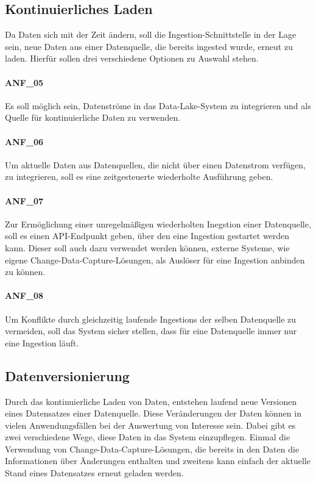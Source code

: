 \subsection{Kontinuierliches Laden}
Da Daten sich mit der Zeit ändern, soll die Ingestion-Schnittstelle in der Lage sein, neue Daten aus einer Datenquelle, die bereits ingested wurde, erneut zu laden.
Hierfür sollen drei verschiedene Optionen zu Auswahl stehen.

\paragraph{ANF\_05}
\label{ANF_05}
Es soll möglich sein, Datenströme in das Data-Lake-System zu integrieren und als Quelle für kontinuierliche Daten zu verwenden.

\paragraph{ANF\_06}
\label{ANF_06}
Um aktuelle Daten aus Datenquellen, die nicht über einen Datenstrom verfügen, zu integrieren, soll es eine zeitgesteuerte wiederholte Ausführung geben.

\paragraph{ANF\_07}
\label{ANF_07}
Zur Ermöglichung einer unregelmäßigen wiederholten Inegstion einer Datenquelle, soll es einen API-Endpunkt geben, über den eine Ingestion gestartet werden kann.
Dieser soll auch dazu verwendet werden können, externe Systeme, wie eigene Change-Data-Capture-Lösungen, als Auslöser für eine Ingestion anbinden zu können.

\paragraph{ANF\_08}
\label{ANF_08}
Um Konflikte durch gleichzeitig laufende Ingestions der selben Datenquelle zu vermeiden, soll das System sicher stellen, dass für eine Datenquelle immer nur eine Ingestion läuft.

\subsection{Datenversionierung}
Durch das kontinuierliche Laden von Daten, entstehen laufend neue Versionen eines Datensatzes einer Datenquelle.
Diese Veränderungen der Daten können in vielen Anwendungsfällen bei der Auswertung von Interesse sein.
Dabei gibt es zwei verschiedene Wege, diese Daten in das System einzupflegen.
Einmal die Verwendung von Change-Data-Capture-Lösungen, die bereits in den Daten die Informationen über Änderungen enthalten und zweitens kann einfach der aktuelle Stand eines Datensatzes erneut geladen werden.

